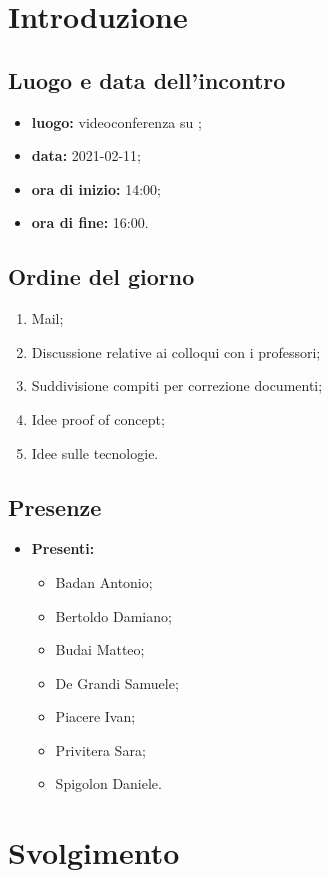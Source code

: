 \section*{Introduzione}
\subsection*{Luogo e data dell'incontro}
\begin{itemize}
\item \textbf{luogo:} videoconferenza su ;
\item \textbf{data:} 2021-02-11;
\item \textbf{ora di inizio:} 14:00;
\item \textbf{ora di fine:} 16:00.
\end{itemize}

\subsection*{Ordine del giorno}
\begin{enumerate}
	\item Mail;
	\item Discussione relative ai colloqui con i professori;
	\item Suddivisione compiti per correzione documenti;
	\item Idee proof of concept;
	\item Idee sulle tecnologie.
\end{enumerate}

\subsection*{Presenze}
\begin{itemize}
	\item \textbf{Presenti:}
	\begin{itemize}
		\item Badan Antonio;
		\item Bertoldo Damiano;
		\item Budai Matteo;
		\item De Grandi Samuele;
		\item Piacere Ivan;
		\item Privitera Sara;
		\item Spigolon Daniele.
	\end{itemize}
\end{itemize}

\section*{Svolgimento}
